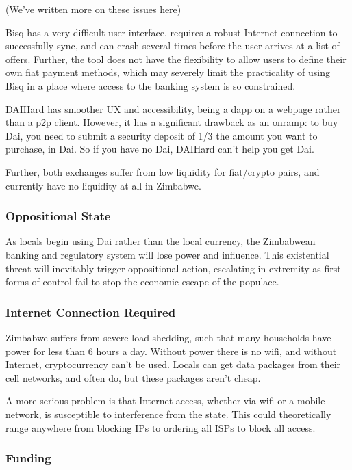 \documentclass{article}
\begin{document}
(We've written more on these issues \href{https://bisq.network/}{here})

Bisq has a very difficult user interface, requires a robust Internet connection to successfully sync, and can crash several times before the user arrives at a list of offers. Further, the tool does not have the flexibility to allow users to define their own fiat payment methods, which may severely limit the practicality of using Bisq in a place where access to the banking system is so constrained.

DAIHard has smoother UX and accessibility, being a dapp on a webpage rather than a p2p client. However, it has a significant drawback as an onramp: to buy Dai, you need to submit a security deposit of 1/3 the amount you want to purchase, in Dai. So if you have no Dai, DAIHard can't help you get Dai.

Further, both exchanges suffer from low liquidity for fiat/crypto pairs, and currently have no liquidity at all in Zimbabwe.

\subsubsection{Oppositional State} \label{oppositional state}

As locals begin using Dai rather than the local currency, the Zimbabwean banking and regulatory system will lose power and influence. This existential threat will inevitably trigger oppositional action, escalating in extremity as first forms of control fail to stop the economic escape of the populace.

\subsubsection{Internet Connection Required} \label{internet required}

Zimbabwe suffers from severe load-shedding, such that many households have power for less than 6 hours a day. Without power there is no wifi, and without Internet, cryptocurrency can't be used. Locals can get data packages from their cell networks, and often do, but these packages aren't cheap.

A more serious problem is that Internet access, whether via wifi or a mobile network, is susceptible to interference from the state. This could theoretically range anywhere from blocking IPs to ordering all ISPs to block all access.

\subsubsection{Funding} \label{funding}
\end{document}
